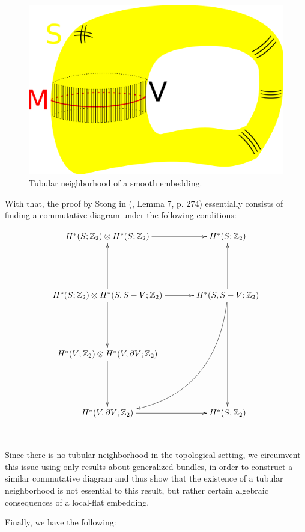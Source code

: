 \documentclass[12pt,oneside]{book}
\newcommand{\Z}{\mathbb{Z}}
\newcommand{\tensor}{\otimes}
\begin{document}
    \begin{figure}[h]
    	\centering
    	\includegraphics[scale=0.25]{viz_tub.pdf}
    	\caption{Tubular neighborhood of a smooth embedding.}
    \end{figure}

    With that, the proof by Stong in (\cite{stong}, Lemma 7, p. 274) essentially consists of finding a commutative diagram under the following 
    conditions:

    $$ \xymatrix @C=0.5cm {
    	H^{*}(S;\Z_{2})\tensor H^{*}(S;\Z_{2}) \ar[rr] & & H^{*}(S;\Z_{2}) \\
    	& & \\		 
    	H^{*}(S;\Z_{2})\tensor H^{*}(S,S-V;\Z_{2}) \ar[uu] \ar[rr] \ar[dd] & & H^{*}(S,S-V;\Z_{2}) \ar[uu] \ar@/^1.5cm/[lldddd] \ar[dddd] \\
    	& & \\				
    	H^{*}(V;\Z_{2})\tensor H^{*}(V,\partial V;\Z_{2}) \ar[dd] & & \\
    	& & \\	
    	H^{*}(V,\partial V;\Z_{2}) \ar[rr] & & H^{*}(S;\Z_{2})
    } $$

    \

    Since there is no tubular neighborhood in the topological setting, we circumvent this issue using only 
    results about generalized bundles, in order to construct a similar commutative diagram and thus show that the existence of a tubular 
    neighborhood is not essential to this result, but rather certain algebraic consequences of a local-flat 
    embedding.

    Finally, we have the following:
\end{document}
